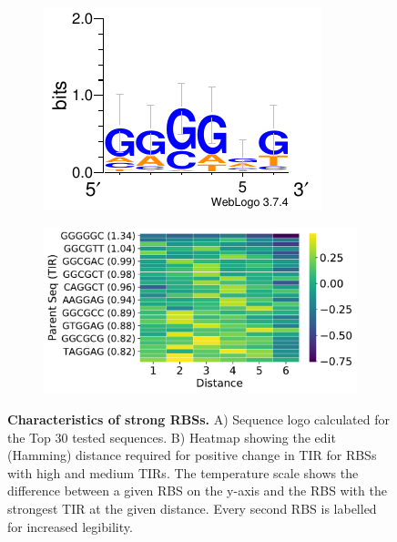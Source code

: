\documentclass{scrartcl}[2013/05/29]%
\begin{document}
\begin{figure}[!t]
     \centering
     \begin{subfigure}[b]{0.49\textwidth}
         \centering
         \caption{}
         \includegraphics[scale=1.2]{plots/Main_Paper/TOP30_logo.pdf}
     \end{subfigure}
     \hfill
     \begin{subfigure}[b]{0.49\textwidth}
         \centering
         \caption{}
         \includegraphics[scale=0.43]{plots/Main_Paper/heatmap.pdf}
     \end{subfigure}
     \caption{\textbf{Characteristics of strong RBSs.} A) Sequence logo calculated for the Top 30 tested sequences. B) Heatmap showing the edit (Hamming) distance required for positive change in TIR for RBSs with high and medium TIRs. The temperature scale shows the difference between a given RBS on the y-axis and the RBS with the strongest TIR at the given distance. Every second RBS is labelled for increased legibility.}
     \label{fig:Library characteristics}
\end{figure}
\end{document}

